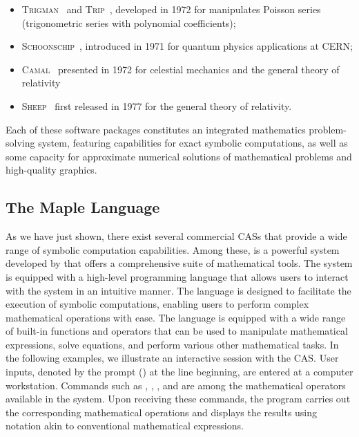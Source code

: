 %
\begin{itemize}
  \setlength{\itemsep}{0.0em}
  \item \textsc{Trigman}~\cite{jeffreys1972trigman} and \textsc{Trip}~\cite{gastineau2011trip}, developed in 1972 for manipulates Poisson series (trigonometric series with polynomial coefficients);
  \item \textsc{Schoonschip}~\cite{strubbe1974presentation}, introduced in 1971 for quantum physics applications at \ac{CERN};
  \item \textsc{Camal}~\cite{bourne1972camal} presented in 1972 for celestial mechanics and the general theory of relativity
  \item \textsc{Sheep}~\cite{frick1977computer} first released in 1977 for the general theory of relativity.
\end{itemize}
%
Each of these software packages constitutes an integrated mathematics problem-solving system, featuring capabilities for exact symbolic computations, as well as some capacity for approximate numerical solutions of mathematical problems and high-quality graphics.

\subsection{The Maple Language}

As we have just shown, there exist several commercial \acp{CAS} that provide a wide range of symbolic computation capabilities. Among these, \Maple{} is a powerful system developed by \MapleSoft{} that offers a comprehensive suite of mathematical tools. The \Maple{} system is equipped with a high-level programming language that allows users to interact with the system in an intuitive manner. The \Maple{} language is designed to facilitate the execution of symbolic computations, enabling users to perform complex mathematical operations with ease. The language is equipped with a wide range of built-in functions and operators that can be used to manipulate mathematical expressions, solve equations, and perform various other mathematical tasks. In the following examples, we illustrate an interactive session with the \Maple{} \ac{CAS}. User inputs, denoted by the prompt (\code{>}) at the line beginning, are entered at a computer workstation. Commands such as , , , and  are among the mathematical operators available in the \Maple{} system. Upon receiving these commands, the program carries out the corresponding mathematical operations and displays the results using notation akin to conventional mathematical expressions.

